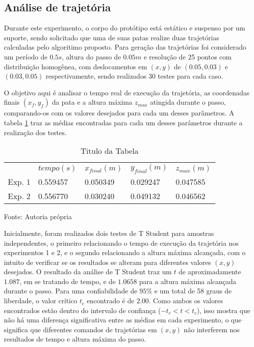 \documentclass[../main.tex]{subfiles}
\begin{document}
  \subsection{Análise de trajetória}
  Durante este experimento, o corpo do protótipo está estático e suspenso por um suporte, sendo solicitado que uma de suas patas realize duas trajetórias calculadas pelo algoritimo proposto. Para geração das trajetórias foi considerado um período de $0.5 s$, altura do passo de $0.05 m$ e resolução de 25 pontos com distribuição homogênea, com deslocamentos em $(x, y)$ de $(0.05, 0.03)$ e $(0.03, 0.05)$ respectivamente, sendo realizados 30 testes para cada caso. 
  
  O objetivo aqui é analisar o tempo real de execução da trajetória, as coordenadas finais $(x_f, y_f)$ da pata e a altura máxima $z_{max}$ atingida durante o passo, comparando-os com os valores desejados para cada um desses parâmetros. A tabela \ref{tab:trajetoria} traz as médias encontradas para cada um desses parâmetros durante a realização dos testes.

  \begin{table}[h]
    \caption{Titulo da Tabela}
    \centering
      \begin{tabular}{lllll}
             & $tempo (s)$ & $x_{final}(m)$ & $y_{final}(m)$ & $z_{max}(m)$ \\
      Exp. 1 & 0.559457 & 0.050349 & 0.029247 & 0.047585 \\
      Exp. 2 & 0.556770 & 0.030240 & 0.049132 & 0.046562      
      \end{tabular}

    Fonte: Autoria própria
    \label{tab:trajetoria}
  \end{table}

  Inicialmente, foram realizados dois testes de T Student para amostras independentes, o primeiro relacionando o tempo de execução da trajetória nos experimentos 1 e 2, e o segundo relacionando a altura máxima alcançada, com o intuito de verificar se os resultados se alteram para diferentes valores $(x, y)$ desejados. O resultado da análise de T Student traz um $t$ de aproximadamente $1.087$, em se tratando de tempo, e de $1.0658$ para a altura máxima alcançada durante o passo. Para uma confiabilidade de $95\%$ e um total de 58 graus de liberdade, o valor crítico $t_c$ encontrado é de $2.00$. Como ambos os valores encontrados estão dentro do intervalo de confiança ($-t_c < t < t_c$), isso mostra que não há uma diferença significativa entre as médias em cada experimento, o que significa que diferentes comandos de trajetórias em $(x, y)$ não interferem nos resultados de tempo e altura máxima do passo.
  
\end{document}
